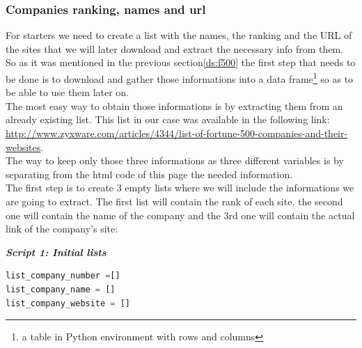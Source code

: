 \documentclass{article}
\begin{document}
\subsubsection{Companies ranking, names and url}
For starters we need to create a list with the names, the ranking and the URL of the sites that we will later download and extract the necessary info from them. So as it was mentioned in the previous section\ref{ds:f500} the first step that needs to be done is to download and gather those informations into a data frame\footnote{a table in Python environment with rows and columns} so as to be able to use them later on.\\
The most easy way to obtain those informations is by extracting them from an already existing list. This list in our case was available in the following link: \href{url}{http://www.zyxware.com/articles/4344/list-of-fortune-500-companies-and-their-websites}.\\
The way to keep only those three informations as three different variables is by separating from the html code of this page the needed information.\\
The first step is to create 3 empty lists where we will include the informations we are going to extract. The first list will contain the rank of each site, the second one will contain the name of the company and the 3rd one will contain the actual link of the company's site:

\begin{center}
\textit{\textbf{Script 1: Initial lists}}
\end{center}
\begin{lstlisting}[language=Python]
list_company_number =[]
list_company_name = []
list_company_website = []
\end{lstlisting}
\end{document}
